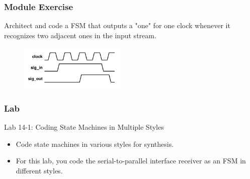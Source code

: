 \documentclass[t, notes, xcolor=table]{beamer}
\begin{document}
\begin{frame}
\frametitle{Module Exercise}
\scriptsize{
Architect and code a FSM that outputs a "one" for one clock whenever it recognizes two adjacent ones in the input stream.
}
\begin{figure}
    \includegraphics[width=0.45\textwidth]{img/14_ex.png}
\end{figure}
\end{frame}

\begin{frame}
\frametitle{Lab}
Lab 14-1: Coding State Machines in Multiple Styles
\scriptsize{
\begin{itemize}
\item Code state machines in various styles for synthesis.
\item For this lab, you code the serial-to-parallel interface receiver as an FSM in different styles.
\end{itemize}
}
\end{frame}
\end{document}
